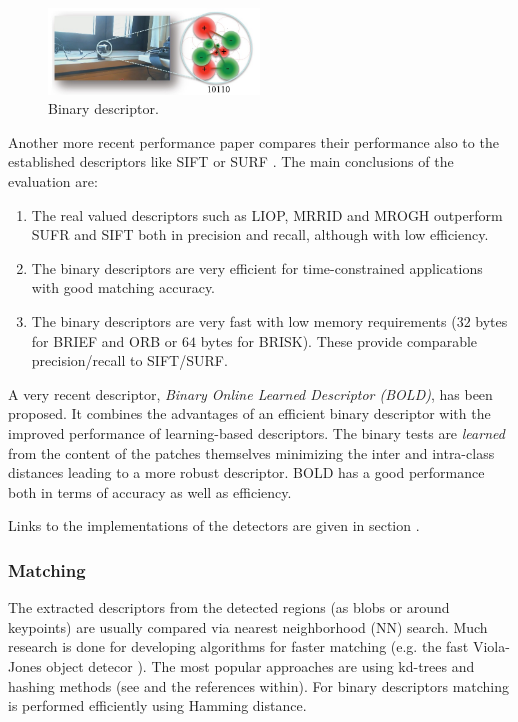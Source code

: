 \begin{figure}[H]
\begin{center}
\includegraphics[width=0.5\textwidth]{fig/BinDescr}
\end{center}
\caption{Binary descriptor.}
\label{fig:bindescr}
\end{figure}

Another more recent performance paper compares their performance also to the established descriptors like SIFT or SURF \cite{conf:icpr:MiksikM12}. The main conclusions of the evaluation are:
\begin{enumerate}
\item{The real valued descriptors such as LIOP, MRRID and MROGH outperform SUFR and SIFT both in precision and recall, although with low efficiency.}
\item{The binary descriptors are very efficient for time-constrained applications with good matching accuracy.}
\item{The binary descriptors are very fast with low memory requirements ($32$ bytes for BRIEF and ORB or $64$ bytes for BRISK). These provide comparable precision/recall to SIFT/SURF.}
\end{enumerate}

A very recent descriptor, {\em Binary Online Learned Descriptor (BOLD)}, \cite{Balntas_2015_CVPR} has been proposed. It combines the advantages of an efficient binary descriptor with the improved performance of learning-based descriptors. The binary tests are {\em learned} from the content of the patches themselves minimizing the inter and  intra-class distances leading to a more robust descriptor. BOLD has a good performance both in terms of accuracy as well as efficiency.

Links to the implementations of the detectors are given in section .
\subsubsection{Matching}
The extracted descriptors from the detected regions (as blobs or around keypoints) are usually compared via nearest neighborhood (NN) search. Much research is done for developing algorithms for faster matching (e.g. the fast Viola-Jones object detecor \cite{Viola01robustreal-time}). The most popular approaches are using kd-trees and hashing methods (see \cite{conf:icpr:MiksikM12} and the references within). For binary descriptors matching is performed efficiently using Hamming distance.


